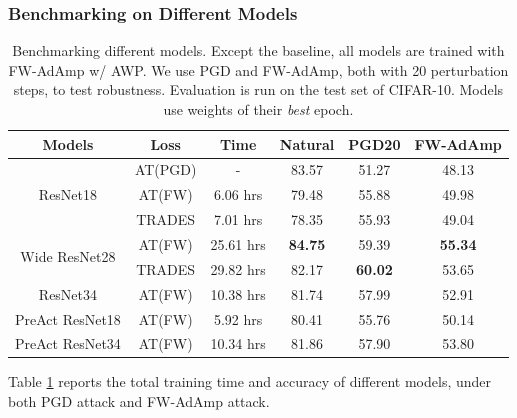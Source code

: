 \documentclass{article}
\begin{document}
        \subsubsection{Benchmarking on Different Models}\label{subs:DefenseModelBenchmarking}
            \begin{table}[h]
                \centering
                \begin{tabular}{cccccc}
                    \hline
                    Models                         & Loss                        & Time      & Natural        & PGD20          & FW-AdAmp             \\ \hline
                    \multirow{3}{*}{ResNet18}      & \multicolumn{1}{l}{AT(PGD)} & -         & 83.57          & 51.27          & 48.13          \\
                                                   & AT(FW)                      & 6.06 hrs  & 79.48          & 55.88          & 49.98          \\
                                                   & TRADES                      & 7.01 hrs  & 78.35          & 55.93          & 49.04          \\ \hline
                    \multirow{2}{*}{Wide ResNet28} & AT(FW)                      & 25.61 hrs & \textbf{84.75} & 59.39          & \textbf{55.34} \\
                                                   & TRADES                      & 29.82 hrs & 82.17          & \textbf{60.02} & 53.65          \\ \hline
                    ResNet34                       & AT(FW)                      & 10.38 hrs & 81.74          & 57.99          & 52.91          \\ \hline
                    PreAct ResNet18                & AT(FW)                      & 5.92 hrs  & 80.41          & 55.76          & 50.14          \\ \hline
                    PreAct ResNet34                & AT(FW)                      & 10.34 hrs & 81.86          & 57.90          & 53.80          \\ \hline
                \end{tabular}
                \caption{Benchmarking different models. Except the baseline, all models are trained with FW-AdAmp w/ AWP. We use PGD and FW-AdAmp, both with 20 perturbation steps, to test robustness. Evaluation is run on the test set of CIFAR-10. Models use weights of their \emph{best} epoch.}
                \label{table:DefenseBenchmarkingResults}
            \end{table}
            Table \ref{table:DefenseBenchmarkingResults} reports the total training time and accuracy of different models, under both PGD attack and FW-AdAmp attack.
\end{document}
